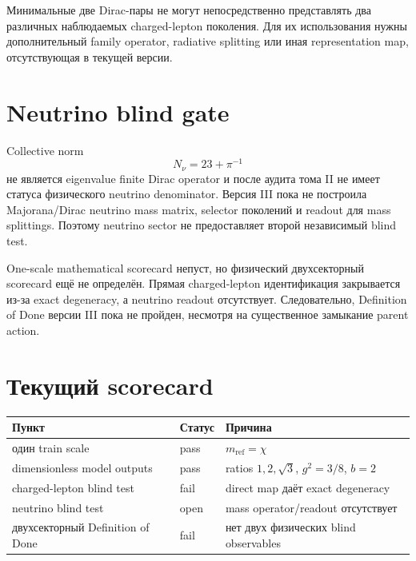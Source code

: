 \begin{proposition}
Минимальные две Dirac-пары не могут непосредственно представлять два
различных наблюдаемых charged-lepton поколения. Для их использования
нужны дополнительный family operator, radiative splitting или иная
representation map, отсутствующая в текущей версии.
\end{proposition}

\section{Neutrino blind gate}

Collective norm
\begin{equation}
 N_\nu=23+\pi^{-1}
\end{equation}
не является eigenvalue finite Dirac operator и после аудита тома II не
имеет статуса физического neutrino denominator. Версия III пока не
построила Majorana/Dirac neutrino mass matrix, selector поколений и
readout для mass splittings. Поэтому neutrino sector не предоставляет
второй независимый blind test.

\begin{theorem}
One-scale mathematical scorecard непуст, но физический двухсекторный
scorecard ещё не определён. Прямая charged-lepton идентификация закрывается
из-за exact degeneracy, а neutrino readout отсутствует. Следовательно,
Definition of Done версии III пока не пройден, несмотря на существенное
замыкание parent action.
\end{theorem}

\section{Текущий scorecard}

\begin{center}
\begin{tabular}{p{}p{}p{}}
\toprule
Пункт & Статус & Причина \\
\midrule
один train scale & pass & \(m_{\mathrm{ref}}=\chi\) \\
dimensionless model outputs & pass & ratios \(1,2,\sqrt3\), \(g^2=3/8\), \(b=2\) \\
charged-lepton blind test & fail & direct map даёт exact degeneracy \\
neutrino blind test & open & mass operator/readout отсутствует \\
двухсекторный Definition of Done & fail & нет двух физических blind observables \\
\bottomrule
\end{tabular}
\end{center}

